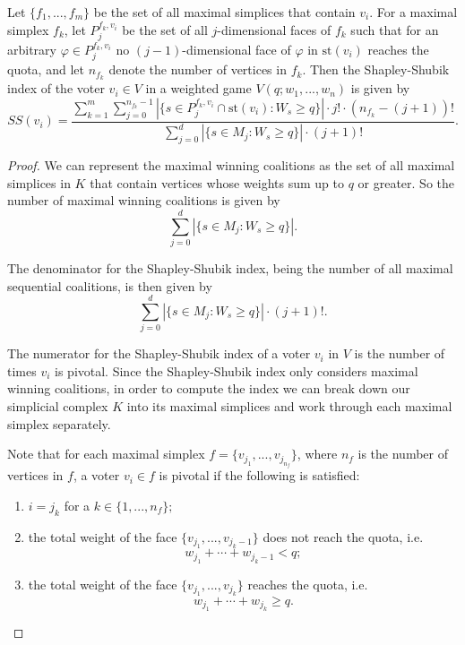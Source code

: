 \documentclass[10pt,a4paper]{amsart}
\begin{document}
\begin{thm}
Let $\{f_1,...,f_m\}$ be the set of all maximal simplices that contain $v_i$. For a maximal simplex $f_k$, let $P_{j}^{f_k, v_i}$ be the set of all $j$-dimensional faces of $f_k$ such that for an arbitrary $\varphi \in P_{j}^{f_k, v_i}$ no $(j-1)$-dimensional face of $\varphi$ in $\text{st}(v_i)$ reaches the quota, and let $n_{f_k}$ denote the number of vertices in $f_k$. Then the Shapley-Shubik index of the voter $v_i \in V$ in a weighted game $V(q;w_1,...,w_n)$ is given by
$$SS(v_i)=\frac{\sum_{k=1}^{m} \sum_{j=0}^{n_{f_k}-1} |\{s\in P_{j}^{f_k, v_i} \cap \text{st}(v_i): W_s \geq q\}|\cdot j! \cdot (n_{f_k}-(j+1))!}{\sum_{j=0}^d |\{s\in M_j: W_s \geq q\}|\cdot (j+1)!}.$$
\end{thm}

\begin{proof}
We can represent the maximal winning coalitions as the set of all maximal simplices in $K$ that contain vertices whose weights sum up to $q$ or greater. So the number of maximal winning coalitions is given by
$$\sum_{j=0}^d |\{s\in M_j: W_s \geq q\}|.$$

The denominator for the Shapley-Shubik index, being the number of all maximal sequential coalitions, is then given by
$$\sum_{j=0}^d |\{s\in M_j: W_s \geq q\}|\cdot (j+1)!.$$

The numerator for the Shapley-Shubik index of a voter $v_i$ in $V$ is the number of times $v_i$ is pivotal. Since the Shapley-Shubik index only considers maximal winning coalitions, in order to compute the index we can break down our simplicial complex $K$ into its maximal simplices and work through each maximal simplex separately. 

Note that for each maximal simplex $f=\{v_{j_1},...,v_{j_{n_f}}\}$, where $n_f$ is the number of vertices in $f$, a voter $v_i \in f$ is pivotal if the following is satisfied:
\begin{enumerate}
\item[(i)] $i=j_k$ for a $k\in \{1,...,n_f\};$
\item[(ii)]  the total weight of the face $\{v_{j_1},...,v_{j_k-1}\}$ does not reach the quota, i.e.
$$w_{j_1}+\cdots+w_{j_k-1}<q;$$
\item[(iii)]  the total weight of the face $\{v_{j_1},...,v_{j_k}\}$ reaches the quota, i.e.
$$w_{j_1}+\cdots+w_{j_k}\geq q.$$
\end{enumerate}


\end{proof}
\end{document}
